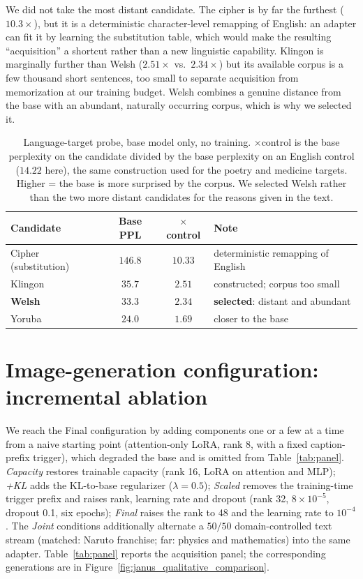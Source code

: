 \documentclass{article}
\begin{document}
We did not take the most distant candidate. The cipher is by far the furthest
($10.3\times$), but it is a deterministic character-level remapping of English:
an adapter can fit it by learning the substitution table, which would make the
resulting ``acquisition'' a shortcut rather than a new linguistic capability.
Klingon is marginally further than Welsh ($2.51\times$ vs.\ $2.34\times$) but its
available corpus is a few thousand short sentences, too small to separate
acquisition from memorization at our training budget. Welsh combines a genuine
distance from the base with an abundant, naturally occurring corpus, which is why
we selected it.

\begin{table}[h]\centering\small
\setlength{\tabcolsep}{8pt}
\begin{tabular}{lccl}
\toprule
Candidate & Base PPL & $\times$control & Note \\
\midrule
Cipher (substitution) & $146.8$ & $10.33$ & deterministic remapping of English \\
Klingon               & $35.7$  & $2.51$  & constructed; corpus too small \\
\textbf{Welsh}        & $33.3$  & $\mathbf{2.34}$ & \textbf{selected}: distant and abundant \\
Yoruba                & $24.0$  & $1.69$  & closer to the base \\
\bottomrule
\end{tabular}
\caption{Language-target probe, base model only, no training. $\times$control is
the base perplexity on the candidate divided by the base perplexity on an English
control ($14.22$ here), the same construction used for the poetry and medicine
targets. Higher = the base is more surprised by the corpus. We selected Welsh
rather than the two more distant candidates for the reasons given in the text.}
\label{tab:langprobe}
\end{table}


\section{Image-generation configuration: incremental ablation}
\label{app:ablation}
We reach the Final configuration by adding components one or a few at a time from
a naive starting point (attention-only LoRA, rank 8, with a fixed caption-prefix
trigger), which degraded the base and is omitted from Table~\ref{tab:panel}.
\textit{Capacity} restores trainable capacity (rank 16, LoRA on attention and
MLP); \textit{+KL} adds the KL-to-base regularizer ($\lambda{=}0.5$);
\textit{Scaled} removes the training-time trigger prefix and raises rank, learning
rate and dropout (rank 32, $8\times10^{-5}$, dropout 0.1, six epochs);
\textit{Final} raises the rank to 48 and the learning rate to $10^{-4}$. The
\textit{Joint} conditions additionally alternate a $50/50$ domain-controlled text
stream (matched: Naruto franchise; far: physics and mathematics) into the same
adapter. Table~\ref{tab:panel} reports the acquisition panel; the corresponding
generations are in Figure~\ref{fig:janus_qualitative_comparison}.
\end{document}
